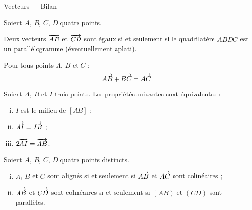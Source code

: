 \documentclass[12pt]{article}
\begin{document}
\begin{center}
\Large Vecteurs --- Bilan
\end{center}

\begin{multicols}{2}
\begin{propriete}[Parallélogramme]Soient $A$, $B$, $C$, $D$ quatre points.

    Deux vecteurs $\overrightarrow{AB}$ et $\overrightarrow{CD}$ sont égaux si et seulement
    si le quadrilatère $ABDC$ est un parallélogramme (éventuellement aplati).
\end{propriete}

\begin{propriete} Pour tous points $A$, $B$ et $C$ :
  \[\overrightarrow{AB}+\overrightarrow{BC}=\overrightarrow{AC}\]
\end{propriete}

\begin{propriete}[Milieu]
  Soient $A$, $B$ et $I$ trois points. Les propriétés suivantes sont équivalentes :
  \begin{enumerate}[(i)]
    \item $I$ est le milieu de $[AB]$ ;
    \item $\overrightarrow{AI}=\overrightarrow{IB}$ ;
    \item $2\overrightarrow{AI}=\overrightarrow{AB}$.
  \end{enumerate}
\end{propriete}

\begin{propriete}[Alignement] Soient $A$, $B$, $C$, $D$ quatre points distincts.
  \begin{enumerate}[(i)]
    \item $A$, $B$ et $C$ sont alignés  si et seulement si $\overrightarrow{AB}$ et $\overrightarrow{AC}$ sont colinéaires ;
    \item $\overrightarrow{AB}$ et $\overrightarrow{CD}$ sont colinéaires si et seulement si $\left( AB \right)$ et $\left( CD \right)$ sont parallèles.
  \end{enumerate}
\end{propriete}

\columnbreak

\begin{center}
\end{center}
\end{multicols}
\end{document}
